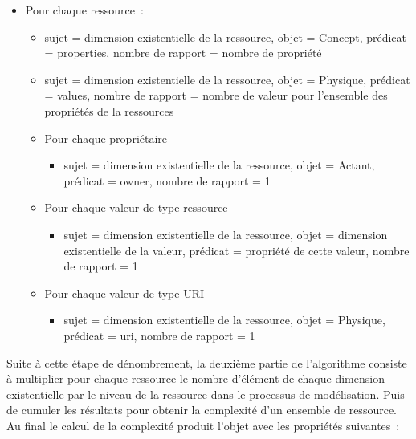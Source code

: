\documentclass[
  a4paper,
  DIV=11,
  numbers=noendperiod]{scrreprt}
\providecommand{\tightlist}{%
  \setlength{\itemsep}{0pt}\setlength{\parskip}{0pt}}\usepackage{longtable,booktabs,array}
\begin{document}
\begin{itemize}
\item
  Pour chaque ressource~:

  \begin{itemize}
  \item
    sujet = dimension existentielle de la ressource, objet = Concept,
    prédicat = properties, nombre de rapport = nombre de propriété
  \item
    sujet = dimension existentielle de la ressource, objet = Physique,
    prédicat = values, nombre de rapport = nombre de valeur pour
    l'ensemble des propriétés de la ressources
  \item
    Pour chaque propriétaire

    \begin{itemize}
    \tightlist
    \item
      sujet = dimension existentielle de la ressource, objet = Actant,
      prédicat = owner, nombre de rapport = 1
    \end{itemize}
  \item
    Pour chaque valeur de type ressource

    \begin{itemize}
    \tightlist
    \item
      sujet = dimension existentielle de la ressource, objet = dimension
      existentielle de la valeur, prédicat = propriété de cette valeur,
      nombre de rapport = 1
    \end{itemize}
  \item
    Pour chaque valeur de type URI

    \begin{itemize}
    \tightlist
    \item
      sujet = dimension existentielle de la ressource, objet = Physique,
      prédicat = uri, nombre de rapport = 1
    \end{itemize}
  \end{itemize}
\end{itemize}

Suite à cette étape de dénombrement, la deuxième partie de l'algorithme
consiste à multiplier pour chaque ressource le nombre d'élément de
chaque dimension existentielle par le niveau de la ressource dans le
processus de modélisation. Puis de cumuler les résultats pour obtenir la
complexité d'un ensemble de ressource. Au final le calcul de la
complexité produit l'objet avec les propriétés suivantes~:
\end{document}
